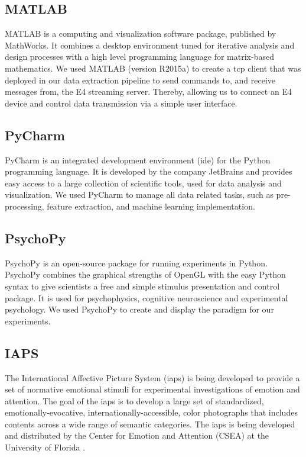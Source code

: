 \subsection{MATLAB}
MATLAB is a computing and visualization software package, published by MathWorks. It combines a desktop environment tuned for iterative analysis and design processes with a high level programming language for matrix-based mathematics. We used MATLAB (version R2015a) to create a \gls{tcp} client that was deployed in our data extraction pipeline to send commands to, and receive messages from, the E4 streaming server. Thereby, allowing us to connect an E4 device and control data transmission via a simple user interface.
\subsection{PyCharm}
PyCharm is an integrated development environment (\gls{ide}) for the Python programming language. It is developed by the company JetBrains and provides easy access to a large collection of scientific tools, used for data analysis and visualization. We used PyCharm to manage all data related tasks, such as pre-processing, feature extraction, and machine learning implementation. 

\subsection{PsychoPy}
PsychoPy is an open-source package for running experiments in Python. PsychoPy combines the graphical strengths of OpenGL with the easy Python syntax to give scientists a free and simple stimulus presentation and control package. It is used for psychophysics, cognitive neuroscience and experimental psychology. We used PsychoPy to create and display the paradigm for our experiments. 

\subsection{IAPS}
The International Affective Picture System (\gls{iaps}) is being developed to provide a set of normative emotional stimuli for experimental investigations of emotion and attention. The goal of the \gls{iaps} is to develop a large set of standardized, emotionally-evocative, internationally-accessible, color photographs that includes contents across a wide range of semantic categories. The \gls{iaps} is being developed and distributed by the Center for Emotion and Attention (CSEA) at the University of Florida \cite{Lang2008}.
